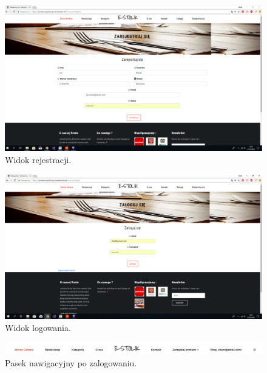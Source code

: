 \documentclass{article}
\begin{document}
\begin{figure}[H]
\centering
	\includegraphics[width=1.00\textwidth]{screens/register.png}
	\caption{Widok rejestracji.}
	\label{fig:register}
\end{figure}

\begin{figure}[H]
\centering
	\includegraphics[width=1.00\textwidth]{screens/login.png}
	\caption{Widok logowania.}
	\label{fig:login}
\end{figure}

\begin{figure}[H]
\centering
	\includegraphics[width=1.00\textwidth]{screens/loged_in.png}
	\caption{Pasek nawigacyjny po zalogowaniu.}
	\label{fig:loged_in}
\end{figure}
\end{document}
